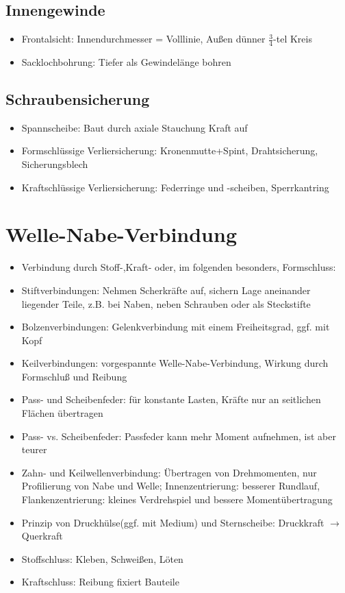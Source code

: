 \documentclass[a4paper,DIV=15,fontsize=11pt]{scrartcl}
\begin{document}
\subsection{Innengewinde}
\begin{itemize}
	\item Frontalsicht: Innendurchmesser = Volllinie, Außen dünner $\frac{3}{4}$-tel Kreis
	\item Sacklochbohrung: Tiefer als Gewindelänge bohren
\end{itemize}
	
\subsection{Schraubensicherung}
\begin{itemize}
	\item Spannscheibe: Baut durch axiale Stauchung Kraft auf
	\item Formschlüssige Verliersicherung: Kronenmutte+Spint, Drahtsicherung, Sicherungsblech
	\item Kraftschlüssige Verliersicherung: Federringe und -scheiben, Sperrkantring
\end{itemize}
	
\section{Welle-Nabe-Verbindung}
\begin{itemize}
	\item Verbindung durch Stoff-,Kraft- oder, im folgenden besonders, Formschluss:
	\item Stiftverbindungen: Nehmen Scherkräfte auf, sichern Lage aneinander liegender Teile, z.B. bei Naben, neben Schrauben oder als Steckstifte
	\item Bolzenverbindungen: Gelenkverbindung mit einem Freiheitsgrad, ggf. mit Kopf
	\item Keilverbindungen: vorgespannte Welle-Nabe-Verbindung, Wirkung durch Formschluß und Reibung
	\item Pass- und Scheibenfeder: für konstante Lasten, Kräfte nur an seitlichen Flächen übertragen
	\item Pass- vs. Scheibenfeder: Passfeder kann mehr Moment aufnehmen, ist aber teurer
	\item Zahn- und Keilwellenverbindung: Übertragen von Drehmomenten, nur Profilierung von Nabe und Welle; Innenzentrierung: besserer Rundlauf, Flankenzentrierung: kleines Verdrehspiel und bessere Momentübertragung
	\item Prinzip von Druckhülse(ggf. mit Medium) und Sternscheibe: Druckkraft $\rightarrow$ Querkraft
	\item Stoffschluss: Kleben, Schweißen, Löten
	\item Kraftschluss: Reibung fixiert Bauteile
\end{itemize}	
	
\end{document}
